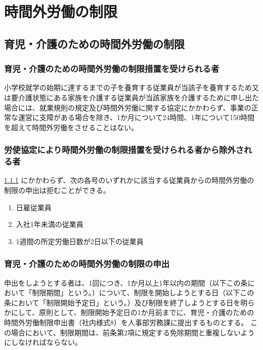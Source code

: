 \documentclass{jsarticle}
\begin{document}
\section{時間外労働の制限}

\subsection{育児・介護のための時間外労働の制限}
\label{育介_条_育児・介護のための時間外労働の制限}

\subsubsection{育児・介護のための時間外労働の制限措置を受けられる者} 
\label{育介_項_育児・介護のための時間外労働の制限措置を受けられる者} 
小学校就学の始期に達するまでの子を養育する従業員が当該子を養育するため又は要介護状態にある家族を介護する従業員が当該家族を介護するために申し出た場合には、就業規則の規定及び時間外労働に関する協定にかかわらず、事業の正常な運営に支障がある場合を除き、1か月について24時間、1年について150時間を超えて時間外労働をさせることはない。

\subsubsection{労使協定により時間外労働の制限措置を受けられる者から除外される者}
\label{育介_項_労使協定により時間外労働の制限措置を受けられる者から除外される者}
\ref{育介_項_育児・介護のための時間外労働の制限措置を受けられる者} にかかわらず、次の各号のいずれかに該当する従業員からの時間外労働の制限の申出は拒むことができる。
\begin{enumerate}
  \item 日雇従業員
  \item 入社1年未満の従業員 
  \item 1週間の所定労働日数が2日以下の従業員 
\end{enumerate}

\subsubsection{育児・介護のための時間外労働の制限の申出}
\label{育介_項_育児・介護のための時間外労働の制限の申出}
申出をしようとする者は、1回につき、1か月以上1年以内の期間（以下この条において「制限期間」という。）について、制限を開始しようとする日（以下この条において「制限開始予定日」という。）及び制限を終了しようとする日を明らかにして、原則として、制限開始予定日の1か月前までに、育児・介護のための時間外労働制限申出書（社内様式8）を人事部労務課に提出するものとする。 この場合において、制限期間は、前条第2項に規定する免除期間と重複しないようにしなければならない。
\end{document}
